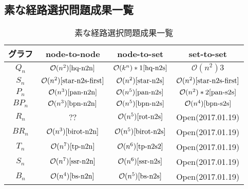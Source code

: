 \documentclass[specialreport]{subfiles}
\begin{document}
\subsection{素な経路選択問題成果一覧}
\begin{table}[htb]
  \begin{center}
    \caption{素な経路選択問題成果一覧}
    \begin{tabular}{|c|c|c|c|} \hline
      グラフ&node-to-node&node-to-set&set-to-set\\ \hline 
      $Q_n$		&$\mathcal{O}(n^2) \cite{hq-n2n}$		&$\mathcal{O}(k^n)*1 \cite{hq-n2s}$		&$\mathcal{O}(n^2) 3$  \cite{hq-s2s}\\ \hline
      $S_n$		&$\mathcal{O}(n^2) \cite{star-n2s-first}$	&$\mathcal{O}(n^2) \cite{star-n2s} $		&$\mathcal{O}(n^2) \cite{star-n2s-first}$ \\ \hline
      $P_n$		&$\mathcal{O}(n^3) \cite{pan-n2n} $		&$\mathcal{O}(n^5) \cite{pan-n2s}$		&$\mathcal{O}(n^2)*2 \cite{pan-s2s}$\\ \hline
      $BP_n$	&$\mathcal{O}(n^3) \cite{bpn-n2n}$		&$\mathcal{O}(n^5) \cite{bpn-n2s}$		&$\mathcal{O}(n^4) \cite{bpn-s2s}$\\ \hline
      $R_n$		&??\cite{rot-n2n} 					&$\mathcal{O}(n^5) \cite{rot-n2s}$		&Open(2017.01.19) \\ \hline
      $BR_n$	&$\mathcal{O}(n^3)\cite{birot-n2n}$		&$\mathcal{O}(n^5) \cite{birot-n2s}$		&Open(2017.01.19)\\ \hline
      $T_n$		&$\mathcal{O}(n^7)\cite{tp-n2n}$		&$\mathcal{O}(n^6) \cite{tp-n2s2}$		&Open(2017.01.19)\\ \hline
      $S_n$		&$\mathcal{O}(n^7)\cite{ssr-n2n}$		&$\mathcal{O}(n^6) \cite{ssr-n2s}$		&Open(2017.01.19)\\ \hline
      $B_n$		&$\mathcal{O}(n^4) \cite{bs-n2n}$		&$\mathcal{O}(n^5) \cite{bs-n2s}$		&Open(2017.01.19)\\ \hline
    \end{tabular}
    \label{tab:intergrationratio}
  \end{center}
\end{table}
\end{document}
